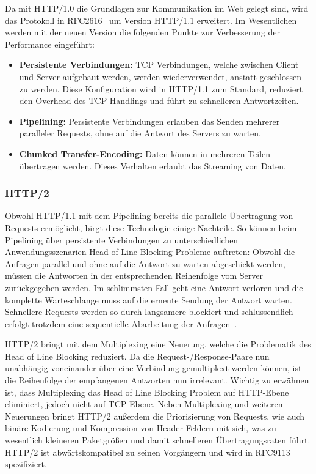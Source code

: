 Da mit HTTP/1.0 die Grundlagen zur Kommunikation im Web gelegt sind, wird das Protokoll in RFC2616~\cite{rfc2616} um Version HTTP/1.1 erweitert.
Im Wesentlichen werden mit der neuen Version die folgenden Punkte zur Verbesserung der Performance eingeführt:

\begin{itemize}
    \item \textbf{Persistente Verbindungen:} TCP Verbindungen, welche zwischen Client und Server aufgebaut werden, werden wiederverwendet, anstatt geschlossen zu werden.
    Diese Konfiguration wird in HTTP/1.1 zum Standard, reduziert den Overhead des TCP-Handlings und führt zu schnelleren Antwortzeiten.
    \item \textbf{Pipelining:} Persistente Verbindungen erlauben das Senden mehrerer paralleler Requests, ohne auf die Antwort des Servers zu warten.
    \item \textbf{Chunked Transfer-Encoding:} Daten können in mehreren Teilen übertragen werden.
    Dieses Verhalten erlaubt das Streaming von Daten.
\end{itemize}

\subsubsection{HTTP/2}

Obwohl HTTP/1.1 mit dem Pipelining bereits die parallele Übertragung von Requests ermöglicht, birgt diese Technologie einige Nachteile.
So können beim Pipelining über persistente Verbindungen zu unterschiedlichen Anwendungsszenarien Head of Line Blocking Probleme auftreten:
Obwohl die Anfragen parallel und ohne auf die Antwort zu warten abgeschickt werden, müssen die Antworten in der entsprechenden Reihenfolge vom Server zurückgegeben werden.
Im schlimmsten Fall geht eine Antwort verloren und die komplette Warteschlange muss auf die erneute Sendung der Antwort warten.
Schnellere Requests werden so durch langsamere blockiert und schlussendlich erfolgt trotzdem eine sequentielle Abarbeitung der Anfragen~\cite{7179400}.

HTTP/2 bringt mit dem Multiplexing eine Neuerung, welche die Problematik des Head of Line Blocking reduziert.
Da die Request-/Response-Paare nun unabhängig voneinander über eine Verbindung gemultiplext werden können, ist die Reihenfolge der empfangenen Antworten nun irrelevant.
Wichtig zu erwähnen ist, dass Multiplexing das Head of Line Blocking Problem auf HTTP-Ebene eliminiert, jedoch nicht auf TCP-Ebene.
Neben Multiplexing und weiteren Neuerungen bringt HTTP/2 außerdem die Priorisierung von Requests, wie auch binäre Kodierung und Kompression von Header Feldern mit sich, was zu wesentlich kleineren Paketgrößen und damit schnelleren Übertragungsraten führt.
HTTP/2 ist abwärtskompatibel zu seinen Vorgängern und wird in RFC9113~\cite{rfc9113} spezifiziert.

